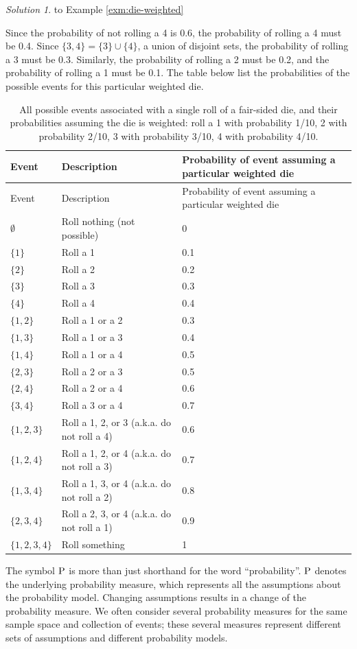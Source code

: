 \documentclass[
]{book}
\theoremstyle{definition}
\theoremstyle{definition}
\theoremstyle{definition}
\theoremstyle{remark}
\newtheorem*{solution}{Solution}
\begin{document}
\begin{solution}
{}to Example \ref{exm:die-weighted}
\end{solution}

Since the probability of not rolling a 4 is 0.6, the probability of rolling a 4 must be 0.4. Since \(\{3, 4\} = \{3\} \cup \{4\}\), a union of disjoint sets, the probability of rolling a 3 must be 0.3. Similarly, the probability of rolling a 2 must be 0.2, and the probability of rolling a 1 must be 0.1. The table below list the probabilities of the possible events for this particular weighted die.

\begin{longtable}[]{@{}lll@{}}
\caption{\label{tab:die-events-weighted} All possible events associated with a single roll of a fair-sided die, and their probabilities assuming the die is weighted: roll a 1 with probability 1/10, 2 with probability 2/10, 3 with probability 3/10, 4 with probability 4/10.}\tabularnewline
\toprule
Event & Description & Probability of event assuming a particular weighted die\tabularnewline
\midrule
\endfirsthead
\toprule
Event & Description & Probability of event assuming a particular weighted die\tabularnewline
\midrule
\endhead
\(\emptyset\) & Roll nothing (not possible) & 0\tabularnewline
\(\{1\}\) & Roll a 1 & 0.1\tabularnewline
\(\{2\}\) & Roll a 2 & 0.2\tabularnewline
\(\{3\}\) & Roll a 3 & 0.3\tabularnewline
\(\{4\}\) & Roll a 4 & 0.4\tabularnewline
\(\{1, 2\}\) & Roll a 1 or a 2 & 0.3\tabularnewline
\(\{1, 3\}\) & Roll a 1 or a 3 & 0.4\tabularnewline
\(\{1, 4\}\) & Roll a 1 or a 4 & 0.5\tabularnewline
\(\{2, 3\}\) & Roll a 2 or a 3 & 0.5\tabularnewline
\(\{2, 4\}\) & Roll a 2 or a 4 & 0.6\tabularnewline
\(\{3, 4\}\) & Roll a 3 or a 4 & 0.7\tabularnewline
\(\{1, 2, 3\}\) & Roll a 1, 2, or 3 (a.k.a. do not roll a 4) & 0.6\tabularnewline
\(\{1, 2, 4\}\) & Roll a 1, 2, or 4 (a.k.a. do not roll a 3) & 0.7\tabularnewline
\(\{1, 3, 4\}\) & Roll a 1, 3, or 4 (a.k.a. do not roll a 2) & 0.8\tabularnewline
\(\{2, 3, 4\}\) & Roll a 2, 3, or 4 (a.k.a. do not roll a 1) & 0.9\tabularnewline
\(\{1, 2, 3, 4\}\) & Roll something & 1\tabularnewline
\bottomrule
\end{longtable}

The symbol \(\textrm{P}\) is more than just shorthand for the word ``probability''. \(\textrm{P}\) denotes the underlying probability measure, which represents all the assumptions about the probability model. Changing assumptions results in a change of the probability measure. We often consider several probability measures for the same sample space and collection of events; these several measures represent different sets of assumptions and different probability models.
\end{document}
